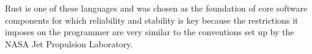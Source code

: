 




Rust \cite{rust} is one of these languages and was chosen as the foundation of core software components for which reliability and stability is key because the restrictions it imposes on the programmer are very similar to the conventions set up by the NASA Jet Propulsion Laboratory. 
